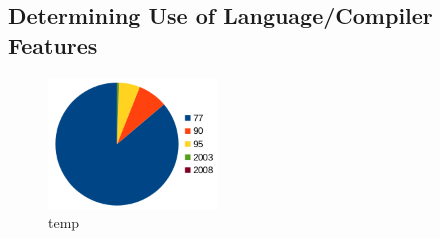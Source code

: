 \begin{table}[htbp]
\begin{center}
\begin{tabular}{|c|c|c|}
\end{tabular}
\label{tab:scalapack-funcs}
\end{center}
\end{table}

\subsection{Determining Use of Language/Compiler Features}
\begin{figure}
\begin{center}
\includegraphics[width=0.4\textwidth]{images/cp2k-fortran-versions.png}
\end{center}
\caption{temp}
\label{fig:fortran-versions}
\end{figure}

